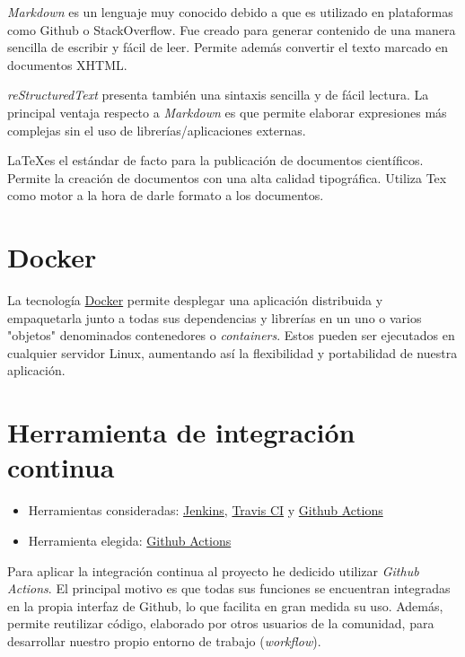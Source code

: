 \emph{Markdown} es un lenguaje muy conocido debido a que es utilizado en plataformas como Github o StackOverflow. Fue creado para generar contenido de una manera sencilla de escribir y fácil de leer. Permite además convertir el texto marcado en documentos XHTML.

\emph{reStructuredText} presenta también una sintaxis sencilla y de fácil lectura. La principal ventaja respecto a \emph{Markdown} es que permite elaborar expresiones más complejas sin el uso de librerías/aplicaciones externas.

\LaTeX es el estándar de facto para la publicación de documentos científicos. Permite la creación de documentos con una alta calidad tipográfica. Utiliza Tex como motor a la hora de darle formato a los documentos.

\section{Docker}\label{docker}

La tecnología \href{https://www.docker.com/}{Docker} permite desplegar una aplicación distribuida y empaquetarla junto a todas sus dependencias y librerías en un uno o varios "objetos" denominados contenedores o \emph{containers}. Estos pueden ser ejecutados en cualquier servidor Linux, aumentando así la flexibilidad y portabilidad de nuestra aplicación. 


\section{Herramienta de integración continua}\label{int-cont}

\begin{itemize}
\tightlist
	\item Herramientas consideradas:
  		\href{https://jenkins.io/}{Jenkins},
  		\href{https://travis-ci.org/} {Travis CI} y
  		\href{https://github.com/features/actions} {Github Actions}
	\item Herramienta elegida:
  		\href{https://github.com/features/actions}{Github Actions}
\end{itemize}

Para aplicar la integración continua al proyecto he dedicido utilizar \emph{Github Actions}. El principal motivo es que todas sus funciones se encuentran integradas en la propia interfaz de Github, lo que facilita en gran medida su uso. Además, permite reutilizar código, elaborado por otros usuarios de la comunidad, para desarrollar nuestro propio entorno de trabajo (\emph{workflow}).


